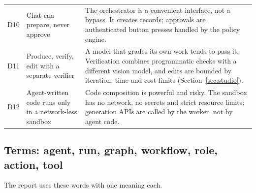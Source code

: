 \documentclass[11pt,a4paper]{article}
\begin{document}
\begin{longtable}{@{}p{0.9cm}p{4.2cm}p{10.2cm}@{}}
D10 & Chat can prepare, never approve & The orchestrator is a convenient interface, not a bypass. It creates records; approvals are authenticated button presses handled by the policy engine.\\
D11 & Produce, verify, edit with a separate verifier & A model that grades its own work tends to pass it. Verification combines programmatic checks with a different vision model, and edits are bounded by iteration, time and cost limits (Section~\ref{sec:studio}).\\
D12 & Agent-written code runs only in a network-less sandbox & Code composition is powerful and risky. The sandbox has no network, no secrets and strict resource limits; generation APIs are called by the worker, not by agent code.\\
\bottomrule
\end{longtable}

\subsection{Terms: agent, run, graph, workflow, role, action, tool}\label{sec:terms}
The report uses these words with one meaning each.
\end{document}

